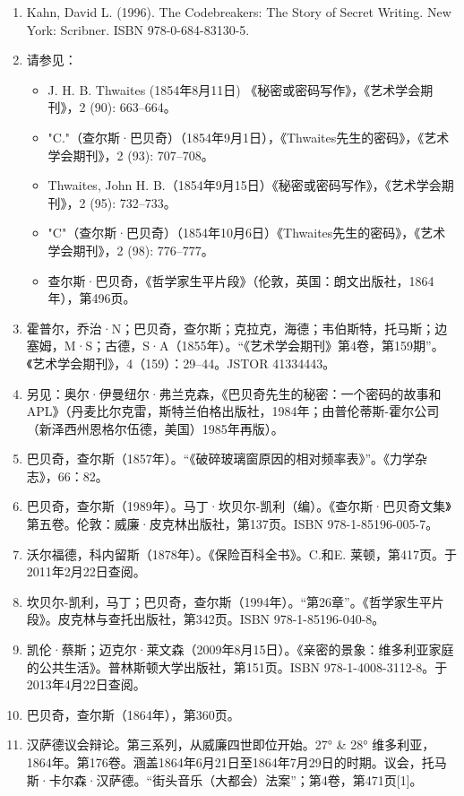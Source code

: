 \begin{enumerate}
\item Kahn, David L. (1996). The Codebreakers: The Story of Secret Writing. New York: Scribner. ISBN 978-0-684-83130-5.
\item 请参见：
\begin{itemize}
\item J. H. B. Thwaites (1854年8月11日) 《秘密或密码写作》，《艺术学会期刊》，2 (90): 663–664。
\item "C."（查尔斯·巴贝奇）（1854年9月1日），《Thwaites先生的密码》，《艺术学会期刊》，2 (93): 707–708。
\item Thwaites, John H. B.（1854年9月15日）《秘密或密码写作》，《艺术学会期刊》，2 (95): 732–733。
\item "C"（查尔斯·巴贝奇）（1854年10月6日）《Thwaites先生的密码》，《艺术学会期刊》，2 (98): 776–777。
\item 查尔斯·巴贝奇，《哲学家生平片段》（伦敦，英国：朗文出版社，1864年），第496页。
\end{itemize}
\item 霍普尔，乔治·N；巴贝奇，查尔斯；克拉克，海德；韦伯斯特，托马斯；边塞姆，M·S；古德，S·A（1855年）。“《艺术学会期刊》第4卷，第159期”。《艺术学会期刊》，4（159）：29–44。JSTOR 41334443。
\item 另见：奥尔·伊曼纽尔·弗兰克森，《巴贝奇先生的秘密：一个密码的故事和APL》（丹麦比尔克雷，斯特兰伯格出版社，1984年；由普伦蒂斯-霍尔公司（新泽西州恩格尔伍德，美国）1985年再版）。
\item 巴贝奇，查尔斯（1857年）。“《破碎玻璃窗原因的相对频率表》”。《力学杂志》，66：82。
\item 巴贝奇，查尔斯（1989年）。马丁·坎贝尔-凯利（编）。《查尔斯·巴贝奇文集》第五卷。伦敦：威廉·皮克林出版社，第137页。ISBN 978-1-85196-005-7。
\item 沃尔福德，科内留斯（1878年）。《保险百科全书》。C.和E. 莱顿，第417页。于2011年2月22日查阅。
\item 坎贝尔-凯利，马丁；巴贝奇，查尔斯（1994年）。“第26章”。《哲学家生平片段》。皮克林与查托出版社，第342页。ISBN 978-1-85196-040-8。
\item 凯伦·蔡斯；迈克尔·莱文森（2009年8月15日）。《亲密的景象：维多利亚家庭的公共生活》。普林斯顿大学出版社，第151页。ISBN 978-1-4008-3112-8。于2013年4月22日查阅。
\item 巴贝奇，查尔斯（1864年），第360页。
\item 汉萨德议会辩论。第三系列，从威廉四世即位开始。27° & 28° 维多利亚，1864年。第176卷。涵盖1864年6月21日至1864年7月29日的时期。议会，托马斯·卡尔森·汉萨德。“街头音乐（大都会）法案”；第4卷，第471页[1]。

\end{enumerate}

